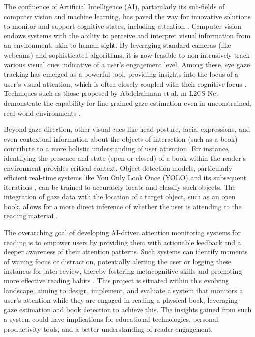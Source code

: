 The confluence of Artificial Intelligence (AI), particularly its sub-fields of computer vision and machine learning, has paved the way for innovative solutions to monitor and support cognitive states, including attention \cite{Sharma_AttentionClassroom_2023}. Computer vision endows systems with the ability to perceive and interpret visual information from an environment, akin to human sight. By leveraging standard cameras (like webcams) and sophisticated algorithms, it is now feasible to non-intrusively track various visual cues indicative of a user's engagement level. Among these, eye gaze tracking has emerged as a powerful tool, providing insights into the locus of a user's visual attention, which is often closely coupled with their cognitive focus \cite{Cheng_GazeSurvey_2021, Kothari_GazeReviewDL_2024}. Techniques such as those proposed by Abdelrahman et al. in L2CS-Net demonstrate the capability for fine-grained gaze estimation even in unconstrained, real-world environments \cite{L2CSNet2022}.

Beyond gaze direction, other visual cues like head posture, facial expressions, and even contextual information about the objects of interaction (such as a book) contribute to a more holistic understanding of user attention. For instance, identifying the presence and state (open or closed) of a book within the reader's environment provides critical context. Object detection models, particularly efficient real-time systems like You Only Look Once (YOLO) \cite{Redmon_YOLO_2016} and its subsequent iterations \cite{Jocher_YOLOv5_2020, Wang_YOLOv9_2024, ultralytics_yolov8_2023}, can be trained to accurately locate and classify such objects. The integration of gaze data with the location of a target object, such as an open book, allows for a more direct inference of whether the user is attending to the reading material \cite{Zhu_GazeObjectFocus_2023, Lai_ReadingCompanion_2017}.

The overarching goal of developing AI-driven attention monitoring systems for reading is to empower users by providing them with actionable feedback and a deeper awareness of their attention patterns. Such systems can identify moments of waning focus or distraction, potentially alerting the user or logging these instances for later review, thereby fostering metacognitive skills and promoting more effective reading habits \cite{Albu_AttentionLearning_2023}. This project is situated within this evolving landscape, aiming to design, implement, and evaluate a system that monitors a user's attention while they are engaged in reading a physical book, leveraging gaze estimation and book detection to achieve this. The insights gained from such a system could have implications for educational technologies, personal productivity tools, and a better understanding of reader engagement.

